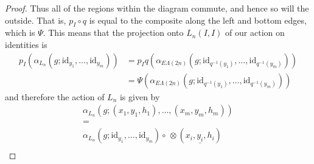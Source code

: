 \documentclass{amsbook} %
\newcommand{\id}{\textrm{id}}
\newcommand{\ELnn}{E\Lambda(\underline{2n})}
\numberwithin{section}{chapter}
\begin{document}
\begin{proof}
Thus all of the regions within the diagram commute, and hence so will the outside. That is, $p_I \circ q$ is equal to the composite along the left and bottom edges, which is $\Psi$. This means that the projection onto $L_n(I,I)$ of our action on identities is
  \begin{align*}
    p_I \left(\alpha_{L_n}\left(g;\id_{y_1}, \ldots, \id_{y_m}\right)\right) &= p_I q\left(\alpha_{\ELnn}\left(g;\id_{q^{-1}(y_1)}, \ldots, \id_{q^{-1}(y_m)}\right)\right)\\
    &= \Psi \left(\alpha_{\ELnn}\left(g;\id_{q^{-1}(y_1)}, \ldots, \id_{q^{-1}(y_m)}\right)\right)
  \end{align*}
and therefore the action of $L_n$ is given by
  \[
    \begin{array}{c}
      \alpha_{L_n}\left(g;(x_1, y_1, h_1), \ldots, (x_m, y_m, h_m)\right) \\
      = \\
      \alpha_{L_n}(g;\id_{y_1}, \ldots, \id_{y_m}) \circ \, \otimes (\underline{x_i,y_i,h_i}) \\

\end{array}\]
\end{proof}
\end{document}
